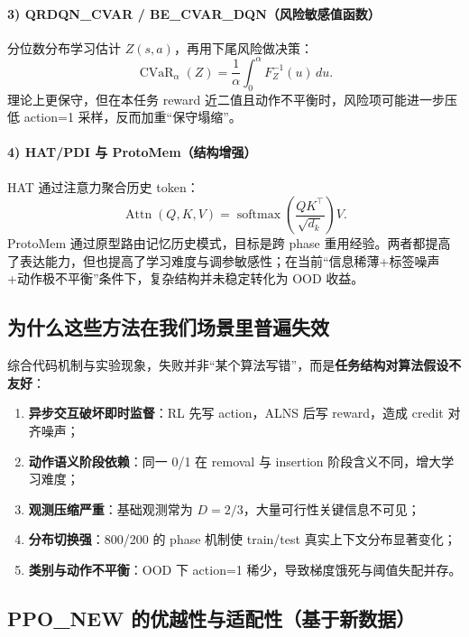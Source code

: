 ﻿\documentclass[11pt,a4paper]{ctexart}
\begin{document}
\paragraph{3) QRDQN\_CVAR / BE\_CVAR\_DQN（风险敏感值函数）}
分位数分布学习估计 \(Z(s,a)\)，再用下尾风险做决策：
\begin{equation}
\operatorname{CVaR}_{\alpha}(Z)=\frac{1}{\alpha}\int_0^\alpha F^{-1}_Z(u)\,du.
\end{equation}
理论上更保守，但在本任务 reward 近二值且动作不平衡时，风险项可能进一步压低 action=1 采样，反而加重“保守塌缩”。

\paragraph{4) HAT/PDI 与 ProtoMem（结构增强）}
HAT 通过注意力聚合历史 token：
\begin{equation}
\operatorname{Attn}(Q,K,V)=\operatorname{softmax}\left(\frac{QK^\top}{\sqrt{d_k}}\right)V.
\end{equation}
ProtoMem 通过原型路由记忆历史模式，目标是跨 phase 重用经验。两者都提高了表达能力，但也提高了学习难度与调参敏感性；在当前“信息稀薄+标签噪声+动作极不平衡”条件下，复杂结构并未稳定转化为 OOD 收益。

\subsection{为什么这些方法在我们场景里普遍失效}
综合代码机制与实验现象，失败并非“某个算法写错”，而是\textbf{任务结构对算法假设不友好}：
\begin{enumerate}[leftmargin=*]
  \item \textbf{异步交互破坏即时监督}：RL 先写 action，ALNS 后写 reward，造成 credit 对齐噪声；
  \item \textbf{动作语义阶段依赖}：同一 0/1 在 removal 与 insertion 阶段含义不同，增大学习难度；
  \item \textbf{观测压缩严重}：基础观测常为 \(D=2/3\)，大量可行性关键信息不可见；
  \item \textbf{分布切换强}：800/200 的 phase 机制使 train/test 真实上下文分布显著变化；
  \item \textbf{类别与动作不平衡}：OOD 下 action=1 稀少，导致梯度饿死与阈值失配并存。
\end{enumerate}

\subsection{PPO\_NEW 的优越性与适配性（基于新数据）}
\end{document}
